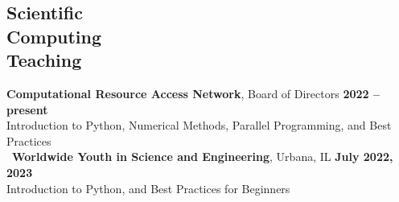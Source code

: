 \documentclass[margin,line]{resume}
\begin{document}
\begin{resume}

    \section{\mysidestyle Scientific\\Computing\\Teaching}
    \textbf{Computational Resource Access Network}, Board of Directors \hfill \textbf{2022 -- present}\\
    Introduction to Python, Numerical Methods, Parallel Programming, and Best Practices \vspace{2mm}\\\
    \textbf{Worldwide Youth in Science and Engineering}, Urbana, IL \hfill \textbf{July 2022, 2023}\\
    Introduction to Python, and Best Practices for Beginners
                \vspace{2mm}\\



\end{resume}
\end{document}
